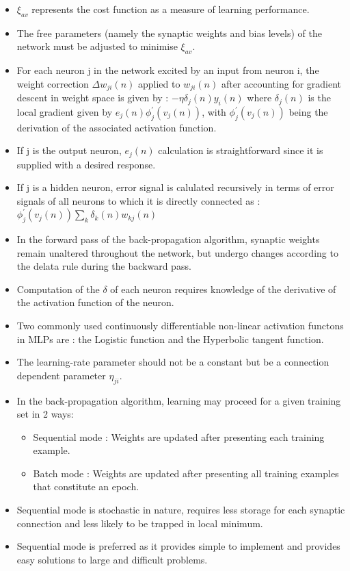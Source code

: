 \documentclass[12pt]{article}
\begin{document}
\begin{itemize}
\item  $\xi_{av}$ represents the cost function as a measure of learning performance.
\item The free parameters (namely the synaptic weights and bias levels) of the network must be adjusted to minimise $\xi_{av}$.
\item For each neuron j in the network excited by an input from neuron i, the weight correction $\Delta w_{ji} (n)$ applied to $w_{ji} (n)$ after accounting for gradient descent in weight space is given by : $-\eta \delta_j(n) y_i(n)$ where $ \delta_j(n)$ is the local gradient given by $e_j (n) \phi^{'}_j(v_j(n))$, with $\phi^{'}_j(v_j(n))$ being the derivation of the associated activation function.
\item If j is the output neuron, $e_j(n)$ calculation is straightforward since it is supplied with a desired response.
\item If j is a hidden neuron, error signal is calulated recursively in terms of error signals of all neurons to which it is directly connected as : $\phi^{'}_j(v_j(n)) \sum_k \delta_k(n)w_{kj} (n)$
\item In the forward pass of the back-propagation algorithm, synaptic weights remain unaltered throughout the network, but undergo changes according to the delata rule during the backward pass.
\item Computation of the $\delta$ of each neuron requires knowledge of the derivative of the activation function of the neuron.
\item Two commonly used continuously differentiable non-linear activation functons in MLPs are : the Logistic function and the Hyperbolic tangent function.
\item The learning-rate parameter should not be a constant but be a connection dependent parameter $\eta_{ji}$.
\item In the back-propagation algorithm, learning may proceed for a given training set in 2 ways:
\begin{itemize}
\item Sequential mode : Weights are updated after presenting each training example.
\item Batch mode :  Weights are updated after presenting all training examples that constitute an epoch.
\end{itemize}
\item Sequential mode is stochastic in nature, requires less storage for each synaptic connection and less likely to be trapped in local minimum.
\item Sequential mode is preferred as it provides simple to implement and provides easy solutions to large and difficult problems.

\end{itemize}
\end{document}
